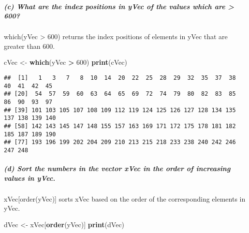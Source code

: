 \documentclass[
]{article}
\newenvironment{Shaded}{\begin{snugshade}}{\end{snugshade}}
\newcommand{\DecValTok}[1]{\textcolor[rgb]{0.00,0.00,0.81}{#1}}
\newcommand{\FunctionTok}[1]{\textcolor[rgb]{0.13,0.29,0.53}{\textbf{#1}}}
\newcommand{\NormalTok}[1]{#1}
\newcommand{\OtherTok}[1]{\textcolor[rgb]{0.56,0.35,0.01}{#1}}
\newcommand{\SpecialCharTok}[1]{\textcolor[rgb]{0.81,0.36,0.00}{\textbf{#1}}}
\begin{document}
\subparagraph{(c) What are the index positions in yVec of the values
which are \textgreater{}
600?}\label{c-what-are-the-index-positions-in-yvec-of-the-values-which-are-600}

which(yVec \textgreater{} 600) returns the index positions of elements
in yVec that are greater than 600.

\begin{Shaded}
\begin{Highlighting}[]
\NormalTok{cVec }\OtherTok{\textless{}{-}} \FunctionTok{which}\NormalTok{(yVec }\SpecialCharTok{\textgreater{}} \DecValTok{600}\NormalTok{)}
\FunctionTok{print}\NormalTok{(cVec)}
\end{Highlighting}
\end{Shaded}

\begin{verbatim}
##  [1]   1   3   7   8  10  14  20  22  25  28  29  32  35  37  38  40  41  42  45
## [20]  54  57  59  60  63  64  65  69  72  74  79  80  82  83  85  86  90  93  97
## [39] 101 103 105 107 108 109 112 119 124 125 126 127 128 134 135 137 138 139 140
## [58] 142 143 145 147 148 155 157 163 169 171 172 175 178 181 182 185 187 189 190
## [77] 193 196 199 202 204 209 210 213 215 218 233 238 240 242 246 247 248
\end{verbatim}

\subparagraph{(d) Sort the numbers in the vector xVec in the order of
increasing values in
yVec.}\label{d-sort-the-numbers-in-the-vector-xvec-in-the-order-of-increasing-values-in-yvec.}

xVec{[}order(yVec){]} sorts xVec based on the order of the corresponding
elements in yVec.

\begin{Shaded}
\begin{Highlighting}[]
\NormalTok{dVec }\OtherTok{\textless{}{-}}\NormalTok{ xVec[}\FunctionTok{order}\NormalTok{(yVec)]}
\FunctionTok{print}\NormalTok{(dVec)}
\end{Highlighting}
\end{Shaded}
\end{document}
